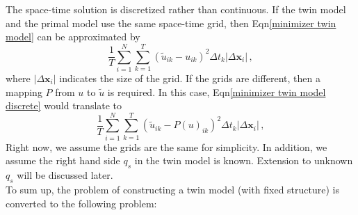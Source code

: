 \documentclass[a4paper,onecolumn]{article}
\theoremstyle{remark}
\begin{document}
\noindent The space-time solution is discretized rather than continuous. 
If the twin model and the 
primal model use the same space-time grid, then Eqn\eqref{minimizer twin model} can be
approximated by
\begin{equation}
    \frac{1}{T}
    \sum_{i=1}^{N}\sum_{k=1}^{T} \left(\tilde{u}_{ik} - u_{ik}\right)^2 \Delta t_k
    \left| \Delta \mathbf{x}_i \right|\,,
    \label{minimizer twin model discrete}
\end{equation}
where $\left| \Delta \mathbf{x}_i \right|$ indicates the size of the grid.
If the grids are different, then a mapping $P$ from $u$ to $\tilde{u}$ is required.
In this case, Eqn\eqref{minimizer twin model discrete} would translate to
\begin{equation}
    \frac{1}{T}
    \sum_{i=1}^{N}\sum_{k=1}^{T} \left(\tilde{u}_{ik} - P(u)_{ik}\right)^2 \Delta t_k
    \left| \Delta \mathbf{x}_i \right|\,,
    \label{minimizer twin model discrete mapping}
\end{equation}
Right now, we assume the grids are the same for simplicity. In addition, we
assume the right hand side $q_s$ in the twin model is known. Extension to
unknown $q_s$ will be discussed later.\\

\noindent To sum up, the problem of constructing a twin model (with fixed structure)
is converted to the following problem:\\
\\
\end{document}
